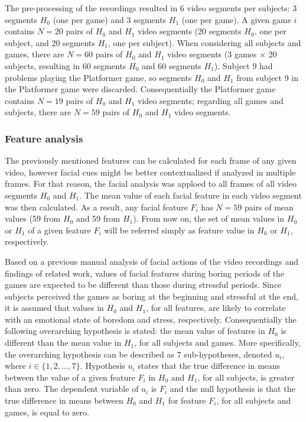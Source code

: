 The pre-processing of the recordings resulted in 6 video segments per subjects: 3 segments $H_0$ (one per game) and 3 segments $H_1$ (one per game). A given game $i$ contains $N=20$ pairs of $H_0$ and $H_1$ video segments (20 segments $H_0$, one per subject, and 20 segments $H_1$, one per subject). When considering all subjects and games, there are $N=60$ pairs of $H_0$ and $H_1$ video segments (3 games $\times$ 20 subjects, resulting in 60 segments $H_0$ and 60 segments $H_1$). Subject 9 had problems playing the Platformer game, so segments $H_0$ and $H_1$ from subject 9 in the Platformer game were discarded. Consequentially the Platformer game contains $N=19$ pairs of $H_0$ and $H_1$ video segments; regarding all games and subjects, there are $N=59$ pairs of $H_0$ and $H_1$ video segments.

\subsubsection{Feature analysis}

The previously mentioned features can be calculated for each frame of any given video, however facial cues might be better contextualized if analyzed in multiple frames. For that reason, the facial analysis was apploed to all frames of all video segments $H_0$ and $H_1$. The mean value of each facial feature in each video segment was then calculated. As a result, any facial feature $F_i$ has $N=59$ pairs of mean values (59 from $H_0$ and 59 from $H_1$). From now on, the set of mean values in $H_0$ or $H_1$ of a given feature $F_i$ will be referred simply as feature value in $H_0$ or $H_1$, respectively.

Based on a previous manual analysis of facial actions of the video recordings \parencite{bevilacqua2016variations} and findings of related work, values of facial features during boring periods of the games are expected to be different than those during stressful periods. Since subjects perceived the games as boring at the beginning and stressful at the end, it is assumed that values in $H_0$ and $H_1$, for all features, are likely to correlate with an emotional state of boredom and stress, respectively. Consequentially the following overarching hypothesis is stated: the mean value of features in $H_0$ is different than the mean value in $H_1$, for all subjects and games. More specifically, the overarching hypothesis can be described as 7 sub-hypotheses, denoted $u_i$, where $i \in \{1, 2, ..., 7\}$. Hypothesis $u_i$ states that the true difference in means between the value of a given feature $F_i$ in $H_0$ and $H_1$, for all subjects, is greater than zero. The dependent variable of $u_i$ is $F_i$ and the null hypothesis is that the true difference in means between $H_0$ and $H_1$ for feature $F_i$, for all subjects and games, is equal to zero.

